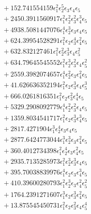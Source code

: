 \documentclass[10pt]{article}
\begin{document}
\begin{align*}
&{}  + 152.741554159 \epsilon_{1}^{2} \epsilon_{2}^{5} \epsilon_{3} \epsilon_{4} \epsilon_{5} \\
&{}  + 2450.3911560917 \epsilon_{1}^{2} \epsilon_{2}^{2} \epsilon_{3}^{2} \epsilon_{4}^{3} \epsilon_{5} \\
&{}  + 4938.5081447076 \epsilon_{1}^{4} \epsilon_{2}^{3} \epsilon_{3} \epsilon_{4} \epsilon_{5} \\
&{}  + 624.39954528291 \epsilon_{1}^{2} \epsilon_{2} \epsilon_{3}^{4} \epsilon_{4}^{2} \epsilon_{5} \\
&{}  + 632.832127461 \epsilon_{1}^{2} \epsilon_{2}^{2} \epsilon_{3}^{3} \epsilon_{4} \epsilon_{5}^{2} \\
&{}  + 634.79645545552 \epsilon_{1}^{2} \epsilon_{2}^{3} \epsilon_{3}^{2} \epsilon_{4} \epsilon_{5}^{2} \\
&{}  + 2559.3982074657 \epsilon_{1}^{4} \epsilon_{2}^{2} \epsilon_{3} \epsilon_{4}^{2} \epsilon_{5} \\
&{}  + 41.626636352194 \epsilon_{1}^{2} \epsilon_{2} \epsilon_{3}^{3} \epsilon_{4} \epsilon_{5}^{3} \\
&{}  + 666.0261816351 \epsilon_{1}^{2} \epsilon_{2} \epsilon_{3}^{2} \epsilon_{4}^{4} \epsilon_{5} \\
&{}  + 5329.2908092779 \epsilon_{1}^{4} \epsilon_{2}^{2} \epsilon_{3}^{2} \epsilon_{4} \epsilon_{5} \\
&{}  + 1359.8034541717 \epsilon_{1}^{2} \epsilon_{2} \epsilon_{3}^{3} \epsilon_{4}^{3} \epsilon_{5} \\
&{}  + 2817.4271904 \epsilon_{1}^{3} \epsilon_{2}^{4} \epsilon_{3} \epsilon_{4} \epsilon_{5} \\
&{}  + 2877.6424773044 \epsilon_{1}^{3} \epsilon_{2}^{3} \epsilon_{3} \epsilon_{4}^{2} \epsilon_{5} \\
&{}  + 360.4012734398 \epsilon_{1}^{2} \epsilon_{2}^{4} \epsilon_{3} \epsilon_{4}^{2} \epsilon_{5} \\
&{}  + 2935.7135285973 \epsilon_{1}^{2} \epsilon_{2}^{3} \epsilon_{3}^{3} \epsilon_{4} \epsilon_{5} \\
&{}  + 395.70038839976 \epsilon_{1}^{4} \epsilon_{2} \epsilon_{3} \epsilon_{4}^{3} \epsilon_{5} \\
&{}  + 410.39600280793 \epsilon_{1}^{2} \epsilon_{2}^{3} \epsilon_{3} \epsilon_{4}^{2} \epsilon_{5}^{2} \\
&{}  + 1764.2391271607 \epsilon_{1}^{3} \epsilon_{2} \epsilon_{3}^{3} \epsilon_{4}^{2} \epsilon_{5} \\
&{}  + 13.875545450731 \epsilon_{1}^{2} \epsilon_{2} \epsilon_{3}^{2} \epsilon_{4} \epsilon_{5}^{4} \\

\end{align*}
\end{document}
